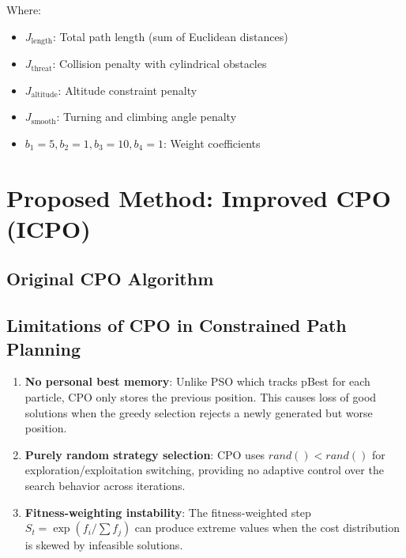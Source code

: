 \documentclass[12pt,a4paper]{article}
\begin{document}
Where:
\begin{itemize}
    \item $J_{\text{length}}$: Total path length (sum of Euclidean distances)
    \item $J_{\text{threat}}$: Collision penalty with cylindrical obstacles
    \item $J_{\text{altitude}}$: Altitude constraint penalty
    \item $J_{\text{smooth}}$: Turning and climbing angle penalty
    \item $b_1=5, b_2=1, b_3=10, b_4=1$: Weight coefficients
\end{itemize}

\section{Proposed Method: Improved CPO (ICPO)}

\subsection{Original CPO Algorithm}

\subsection{Limitations of CPO in Constrained Path Planning}
\begin{enumerate}
    \item \textbf{No personal best memory}: Unlike PSO which tracks pBest for 
          each particle, CPO only stores the previous position. This causes 
          loss of good solutions when the greedy selection rejects a newly 
          generated but worse position.
    \item \textbf{Purely random strategy selection}: CPO uses $rand() < rand()$ 
          for exploration/exploitation switching, providing no adaptive control 
          over the search behavior across iterations.
    \item \textbf{Fitness-weighting instability}: The fitness-weighted step 
          $S_t = \exp(f_i / \sum f_j)$ can produce extreme values when the 
          cost distribution is skewed by infeasible solutions.
\end{enumerate}
\end{document}
